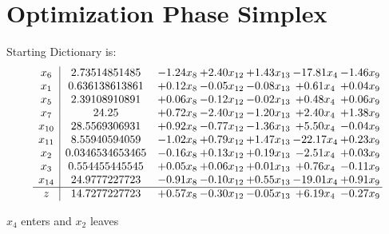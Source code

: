 \documentclass[9pt]{article}
\begin{document}
\section{Optimization Phase Simplex}
Starting Dictionary is:
\[\begin{array}{c| c c@{\hskip 2pt} c@{\hskip 2pt} c@{\hskip 2pt} c@{\hskip 2pt} c@{\hskip 2pt} }
 x_{6}   &  2.73514851485 & -1.24 x_{8} & +  2.40 x_{12} & +  1.43 x_{13} & -17.81 x_{4} & -1.46 x_{9}\\
 x_{1}   &  0.636138613861 & +  0.12 x_{8} & -0.05 x_{12} & -0.08 x_{13} & +  0.61 x_{4} & +  0.04 x_{9}\\
 x_{5}   &  2.39108910891 & +  0.06 x_{8} & -0.12 x_{12} & -0.02 x_{13} & +  0.48 x_{4} & +  0.06 x_{9}\\
 x_{7}   &  24.25 & +  0.72 x_{8} & -2.40 x_{12} & -1.20 x_{13} & +  2.40 x_{4} & +  1.38 x_{9}\\
 x_{10}   &  28.5569306931 & +  0.92 x_{8} & -0.77 x_{12} & -1.36 x_{13} & +  5.50 x_{4} & -0.04 x_{9}\\
 x_{11}   &  8.55940594059 & -1.02 x_{8} & +  0.79 x_{12} & +  1.47 x_{13} & -22.17 x_{4} & +  0.23 x_{9}\\
 x_{2}   &  0.0346534653465 & -0.16 x_{8} & +  0.13 x_{12} & +  0.19 x_{13} & -2.51 x_{4} & +  0.03 x_{9}\\
 x_{3}   &  0.554455445545 & +  0.05 x_{8} & +  0.06 x_{12} & +  0.01 x_{13} & +  0.76 x_{4} & -0.11 x_{9}\\
 x_{14}   &  24.9777227723 & -0.91 x_{8} & -0.10 x_{12} & +  0.55 x_{13} & -19.01 x_{4} & +  0.91 x_{9}\\
\hline
z    &  14.7277227723 & +  0.57 x_{8} & -0.30 x_{12} & -0.05 x_{13} & +  6.19 x_{4} & -0.27 x_{9}\\
\end{array}\]


 $ x_{4} $ enters and $ x_{2} $ leaves 
\end{document}
